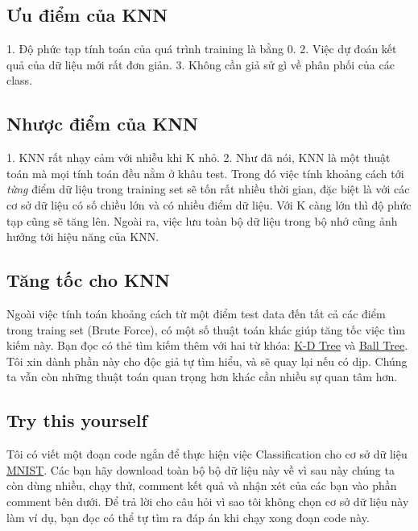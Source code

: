  
 
\subsection{Ưu điểm của KNN}
 
1. Độ phức tạp tính toán của quá trình training là bằng 0. 
2. Việc dự đoán kết quả của dữ liệu mới rất đơn giản. 
3. Không cần giả sử gì về phân phối của các class. 
 
 
 
\subsection{Nhược điểm của KNN}
 
1. KNN rất nhạy cảm với nhiễu khi K nhỏ. 
2. Như đã nói, KNN là một thuật toán mà mọi tính toán đều nằm ở khâu test. Trong đó việc tính khoảng cách tới \textit{từng} điểm dữ liệu trong training set sẽ tốn rất nhiều thời gian, đặc biệt là với các cơ sở dữ liệu có số chiều lớn và có nhiều điểm dữ liệu. Với K càng lớn thì độ phức tạp cũng sẽ tăng lên. Ngoài ra, việc lưu toàn bộ dữ liệu trong bộ nhớ cũng ảnh hưởng tới hiệu năng của KNN. 
 
 
\subsection{Tăng tốc cho KNN}
Ngoài việc tính toán khoảng cách từ một điểm test data đến tất cả các điểm trong traing set (Brute Force), có một số thuật toán khác giúp tăng tốc việc tìm kiếm này. Bạn đọc có thẻ tìm kiếm thêm với hai từ khóa: \href{http://pointclouds.org/documentation/tutorials/kdtree_search.php}{K-D Tree} và \href{https://en.wikipedia.org/wiki/Ball_tree}{Ball Tree}. Tôi xin dành phần này cho độc giả tự tìm hiểu, và sẽ quay lại nếu có dịp. Chúng ta vẫn còn những thuật toán quan trọng hơn khác cần nhiều sự quan tâm hơn.  
 
 
\subsection{Try this yourself}
 
Tôi có viết một đoạn code ngắn để thực hiện việc Classification cho cơ sở dữ liệu \href{http://machinelearningcoban.com/2017/01/04/kmeans2/#bo-co-so-du-lieu-mnist}{MNIST}. Các bạn hãy download toàn bộ bộ dữ liệu này về vì sau này chúng ta còn dùng nhiều, chạy thử, comment kết quả và nhận xét của các bạn vào phần comment bên dưới. Để trả lời cho câu hỏi vì sao tôi không chọn cơ sở dữ liệu này làm ví dụ, bạn đọc có thể tự tìm ra đáp án khi chạy xong đoạn code này. 
 
